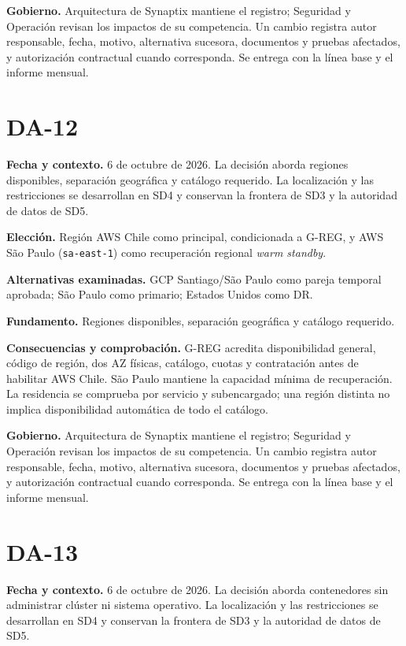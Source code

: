 \documentclass[11pt,letterpaper]{report}
\begin{document}
\textbf{Gobierno.} Arquitectura de Synaptix mantiene el registro; Seguridad y Operación revisan los impactos de su competencia. Un cambio registra autor responsable, fecha, motivo, alternativa sucesora, documentos y pruebas afectados, y autorización contractual cuando corresponda. Se entrega con la línea base y el informe mensual.

\section*{DA-12}

\textbf{Fecha y contexto.} 6 de octubre de 2026. La decisión aborda regiones disponibles, separación geográfica y catálogo requerido. La localización y las restricciones se desarrollan en SD4 y conservan la frontera de SD3 y la autoridad de datos de SD5.

\textbf{Elección.} Región AWS Chile como principal, condicionada a G-REG, y AWS São Paulo (\texttt{sa-east-1}) como recuperación regional \emph{warm standby}.

\textbf{Alternativas examinadas.} GCP Santiago/São Paulo como pareja temporal aprobada; São Paulo como primario; Estados Unidos como DR.

\textbf{Fundamento.} Regiones disponibles, separación geográfica y catálogo requerido.

\textbf{Consecuencias y comprobación.} G-REG acredita disponibilidad general, código de región, dos AZ físicas, catálogo, cuotas y contratación antes de habilitar AWS Chile. São Paulo mantiene la capacidad mínima de recuperación. La residencia se comprueba por servicio y subencargado; una región distinta no implica disponibilidad automática de todo el catálogo.

\textbf{Gobierno.} Arquitectura de Synaptix mantiene el registro; Seguridad y Operación revisan los impactos de su competencia. Un cambio registra autor responsable, fecha, motivo, alternativa sucesora, documentos y pruebas afectados, y autorización contractual cuando corresponda. Se entrega con la línea base y el informe mensual.

\section*{DA-13}

\textbf{Fecha y contexto.} 6 de octubre de 2026. La decisión aborda contenedores sin administrar clúster ni sistema operativo. La localización y las restricciones se desarrollan en SD4 y conservan la frontera de SD3 y la autoridad de datos de SD5.
\end{document}

